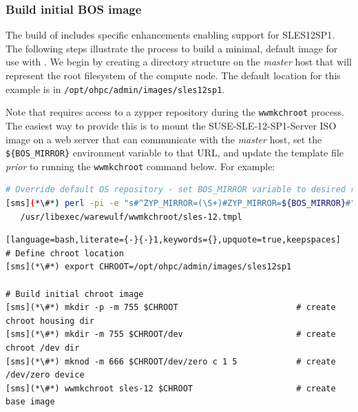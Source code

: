 \documentclass[letterpaper]{article}
\newcommand{\baseOS}{SLES12SP1}
\newcommand{\baseos}{sles12sp1}
\begin{document}
\subsubsection{Build initial BOS image} \label{sec:assemble_bos}

The \OHPC{} build of \Warewulf{} includes specific enhancements enabling support for
\baseOS{}. The following steps illustrate the process to build a minimal, default
image for use with \Warewulf{}. We begin by creating a directory structure on the 
{\em master} host that will represent the root filesystem of the compute node. The 
default location for this example is in
\texttt{/opt/ohpc/admin/images/\baseos{}}.

\begin{center}
  \begin{tcolorbox}[]
    \small Note that \Warewulf{} requires access to a zypper repository during the 
    \texttt{wwmkchroot} process. The easiest way to provide this is to mount 
    the SUSE-SLE-12-SP1-Server ISO image on a web server that can communicate 
    with the {\em master} host, set the \texttt{\$\{BOS\_MIRROR\}} environment 
    variable to that URL, and update the template file {\em prior} to running 
    the \texttt{wwmkchroot} command below. For example:

\begin{lstlisting}[language=bash,keywords={}]
# Override default OS repository - set BOS_MIRROR variable to desired repo location
[sms](*\#*) perl -pi -e "s#^ZYP_MIRROR=(\S+)#ZYP_MIRROR=${BOS_MIRROR}#" \
   /usr/libexec/warewulf/wwmkchroot/sles-12.tmpl
\end{lstlisting}

\end{tcolorbox}
\end{center}

\begin{lstlisting}[language=bash,literate={-}{-}1,keywords={},upquote=true,keepspaces]
# Define chroot location
[sms](*\#*) export CHROOT=/opt/ohpc/admin/images/sles12sp1

# Build initial chroot image
[sms](*\#*) mkdir -p -m 755 $CHROOT                        # create chroot housing dir
[sms](*\#*) mkdir -m 755 $CHROOT/dev                       # create chroot /dev dir
[sms](*\#*) mknod -m 666 $CHROOT/dev/zero c 1 5            # create /dev/zero device
[sms](*\#*) wwmkchroot sles-12 $CHROOT                     # create base image
\end{lstlisting}
\end{document}
